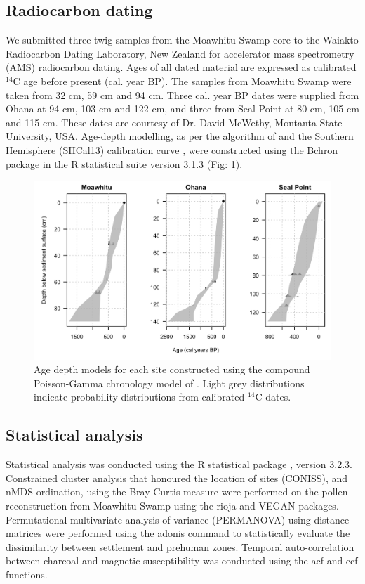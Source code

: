 \documentclass{article}
\begin{document}
\subsection{Radiocarbon dating}

We submitted three twig samples from the Moawhitu Swamp core to the Waiakto Radiocarbon
Dating Laboratory, New Zealand for accelerator mass spectrometry (AMS) radiocarbon dating.
Ages of all dated material are expressed as calibrated $^{14}$C age before present (cal. year
BP). The samples from Moawhitu Swamp were taken from 32 cm, 59 cm and 94 cm.
Three cal. year BP dates were supplied from Ohana at 94 cm, 103 cm and 122 cm,
and three from Seal Point at 80 cm, 105 cm and 115 cm. These dates are courtesy of
Dr. David McWethy, Montanta State University, USA. Age-depth modelling, as per the
algorithm of \citep{haslett2008simple} and the Southern Hemisphere (SHCal13) calibration
curve \citep{hogg2013shcal13}, were constructed using the Bchron package \citep{parnell2014bchron} in the R statistical suite \citep{R-stat} version 3.1.3 (Fig: \ref{fig:age-depth-model}).

\begin{figure}[H]
	\centering
	\includegraphics[scale=0.25]{Figs/age-depth-models/age-depth-model-all.png}
	\caption{Age depth models for each site constructed using the compound Poisson-Gamma chronology model of \cite{haslett2008simple}. Light grey distributions indicate probability distributions from calibrated $^{14}$C dates.}
	\label{fig:age-depth-model}
\end{figure}

\subsection {Statistical analysis}
Statistical analysis was conducted using the R statistical package \citep{R-stat}, version 3.2.3.  Constrained cluster analysis that honoured the location of sites (CONISS), and nMDS ordination, using the Bray-Curtis measure \citep{faith1987compositional} were performed on the pollen reconstruction from Moawhitu Swamp using the rioja \citep{rioja} and VEGAN \citep{dixon2003vegan} packages. Permutational multivariate analysis of variance (PERMANOVA) using distance matrices \citep{anderson2001new} were performed using the adonis command to statistically evaluate the dissimilarity between settlement and prehuman zones. Temporal auto-correlation between charcoal and magnetic susceptibility was conducted using the acf and ccf functions. 
\end{document}
